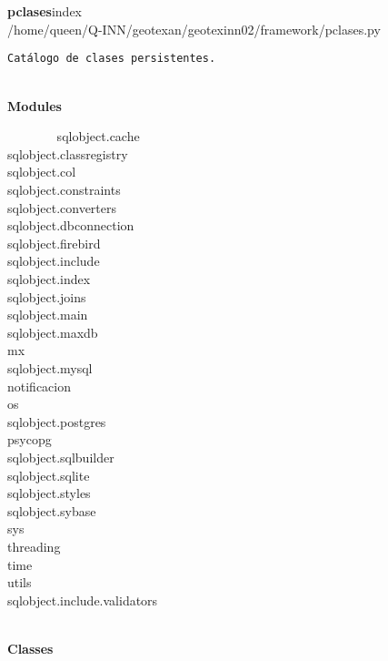 




~\\
~\\{\bf pclases}index\\/home/queen/Q-INN/geotexan/geotexinn02/framework/pclases.py
    \par {\tt Catálogo~de~clases~persistentes.}
\par 


~\\
{\bf Modules}
    
{\tt ~~~~~~}~
sqlobject.cache\\
sqlobject.classregistry\\
sqlobject.col\\
sqlobject.constraints\\
sqlobject.converters\\
sqlobject.dbconnection\\
sqlobject.firebird\\
sqlobject.include\\
sqlobject.index\\
sqlobject.joins\\
sqlobject.main\\
sqlobject.maxdb\\
mx\\
sqlobject.mysql\\
notificacion\\
os\\
sqlobject.postgres\\
psycopg\\
sqlobject.sqlbuilder\\
sqlobject.sqlite\\
sqlobject.styles\\
sqlobject.sybase\\
sys\\
threading\\
time\\
utils\\
sqlobject.include.validators\\
\par 


~\\
{\bf Classes}
    
